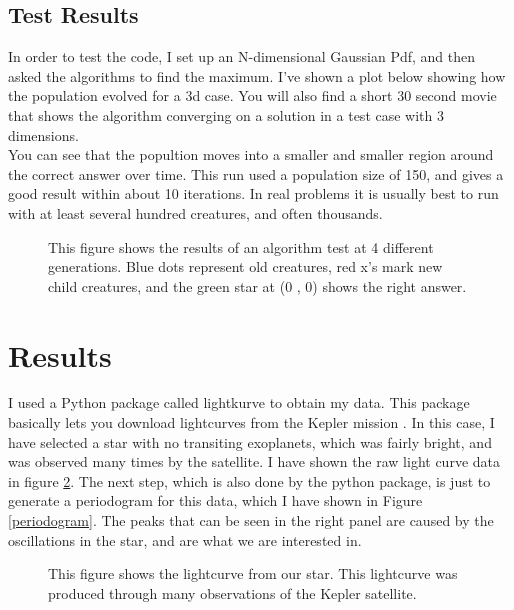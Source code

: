 \documentclass[twocolumn]{aastex63}
\begin{document}
\subsection{Test Results}

In order to test the code, I set up an N-dimensional Gaussian Pdf, and then asked the algorithms to find the maximum. I've shown a plot below showing how the population evolved for a 3d case. You will also find a short 30 second movie that shows the algorithm converging on a solution in a test case with 3 dimensions.\\

You can see that the popultion moves into a smaller and smaller region around the correct answer over time. This run used a population size of 150, and gives a good result within about 10 iterations. In real problems it is usually best to run with at least several hundred creatures, and often thousands.\\

\begin{figure}
\caption{This figure shows the results of an algorithm test at 4 different generations. Blue dots represent old creatures, red x's mark new child creatures, and the green star at (0 , 0) shows the right answer.} \label{test}
\end{figure}






\section{Results}


I used a Python package called lightkurve to obtain my data. This package basically lets you download lightcurves from the Kepler mission \citep{lightkurve}. In this case, I have selected a star with no transiting exoplanets, which was fairly bright, and was observed many times by the satellite. I have shown the raw light curve data in figure \ref{lcurve}. The next step, which is also done by the python package, is just to generate a periodogram for this data, which I have shown in Figure \ref{periodogram}. The peaks that can be seen in the right panel are caused by the oscillations in the star, and are what we are interested in.\\

\begin{figure}
\caption{This figure shows the lightcurve from our star. This lightcurve was produced through many observations of the Kepler satellite.} \label{lcurve}
\end{figure}
\end{document}
